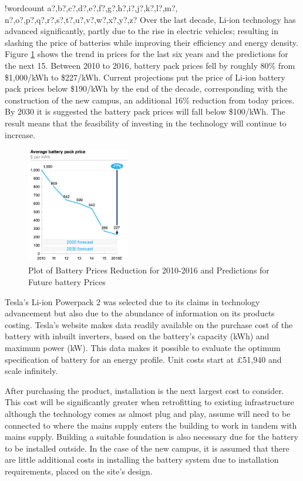 \documentclass[fontsize=9.5pt]{extarticle}
\numberwithin{figure}{section} %
\newcounter{words}
\newenvironment{counted}{%
  \setcounter{words}{0}
  \SearchList!{wordcount}{\stepcounter{words}}
    {a?,b?,c?,d?,e?,f?,g?,h?,i?,j?,k?,l?,m?,
    n?,o?,p?,q?,r?,s?,t?,u?,v?,w?,x?,y?,z?}
  \UndoBoundary{'}
  \SearchOrder{p;}}{%
  \StopSearching}
\begin{document}
\begin{counted}
Over the last decade, Li-ion technology has advanced significantly,
partly due to the rise in electric vehicles; resulting in slashing the
price of batteries while improving their efficiency and energy density.
Figure \ref{mckBatPrice} shows the trend in prices for the last six
years and the predictions for the next 15. Between 2010 to 2016, battery
pack prices fell by roughly 80\% from \$1,000/kWh to \$227/kWh. Current
projections put the price of Li-ion battery pack prices below \$190/kWh
by the end of the decade, corresponding with the construction of the new
campus, an additional 16\% reduction from today prices. By 2030 it is
suggested the battery pack prices will fall below \$100/kWh. The result
means that the feasibility of investing in the technology will continue
to increase.

\begin{figure}[H]
  \centering
  \includegraphics[trim = 0 0 0 0, clip, width=0.4\textwidth]{mckBatPrice.png}
  \caption{Plot of Battery Prices Reduction for 2010-2016 and Predictions for Future battery Prices \cite{mckBat}}
  \label{mckBatPrice}
\end{figure}

Tesla's Li-ion Powerpack 2 was selected due to its claims in technology
advancement but also due to the abundance of information on its products
costing. Tesla's website makes data readily available on the purchase
cost of the battery with inbuilt inverters, based on the battery's
capacity (kWh) and maximum power (kW). This data makes it possible to
evaluate the optimum specification of battery for an energy profile.
Unit costs start at £51,940 and scale infinitely.

After purchasing the product, installation is the next largest cost to
consider. This cost will be significantly greater when retrofitting to
existing infrastructure although the technology comes as almost plug and
play, assume will need to be connected to where the mains supply enters
the building to work in tandem with mains supply. Building a suitable
foundation is also necessary due for the battery to be installed
outside. In the case of the new campus, it is assumed that there are
little additional costs in installing the battery system due to
installation requirements, placed on the site's design.


\end{counted}
\end{document}
